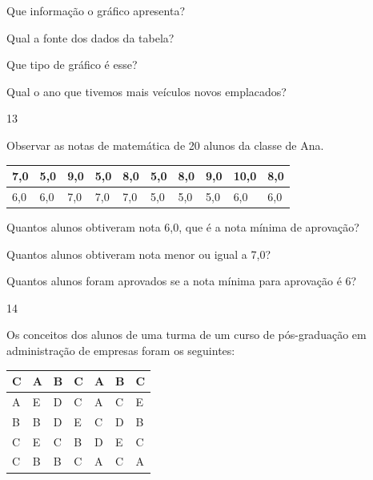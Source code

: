 \begin{escolha}
\begin{escolha}
\begin{escolha}
\item
  Que informação o gráfico apresenta?

\item
  Qual a fonte dos dados da tabela?

\item
  Que tipo de gráfico é esse?

\item
  Qual o ano que tivemos mais veículos novos emplacados?
\end{escolha}

\num{13}

Observar as notas de matemática de 20 alunos da classe de Ana.

\begin{longtable}[]{@{}llllllllll@{}}
\toprule
7,0 & 5,0 & 9,0 & 5,0 & 8,0 & 5,0 & 8,0 & 9,0 & 10,0 &
8,0\tabularnewline
\midrule
\endhead
6,0 & 6,0 & 7,0 & 7,0 & 7,0 & 5,0 & 5,0 & 5,0 & 6,0 & 6,0\tabularnewline
\bottomrule
\end{longtable}

\begin{escolha}
\item
  Quantos alunos obtiveram nota 6,0, que é a nota mínima de aprovação?

\item
  Quantos alunos obtiveram nota menor ou igual a 7,0?

\item
  Quantos alunos foram aprovados se a nota mínima para aprovação é 6?
\end{escolha}

\num{14}

Os conceitos dos alunos de uma turma de um curso de pós-graduação em
administração de empresas foram os seguintes:

\begin{longtable}[]{@{}lllllll@{}}
\toprule
C & A & B & C & A & B & C\tabularnewline
\midrule
\endhead
A & E & D & C & A & C & E\tabularnewline
B & B & D & E & C & D & B\tabularnewline
C & E & C & B & D & E & C\tabularnewline
C & B & B & C & A & C & A\tabularnewline
\bottomrule
\end{longtable}


\end{escolha}
\end{escolha}
